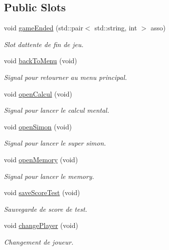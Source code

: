 \subsection*{Public Slots}
\begin{DoxyCompactItemize}
\item 
void \hyperlink{class_robin_main_window_a08e1d2b660c03aa711d552258a368ec0}{game\+Ended} (std\+::pair$<$ std\+::string, int $>$ asso)
\begin{DoxyCompactList}\small\item\em Slot d\textquotesingle{}attente de fin de jeu. \end{DoxyCompactList}\item 
void \hyperlink{class_robin_main_window_a0850e17ae24394b14eb2dcfc4f15eeca}{back\+To\+Menu} (void)
\begin{DoxyCompactList}\small\item\em Signal pour retourner au menu principal. \end{DoxyCompactList}\item 
void \hyperlink{class_robin_main_window_a55e49d0a4d727066b553fc2277dd8a78}{open\+Calcul} (void)
\begin{DoxyCompactList}\small\item\em Signal pour lancer le calcul mental. \end{DoxyCompactList}\item 
void \hyperlink{class_robin_main_window_ab00b403de3169493a08c53f5d623ce6b}{open\+Simon} (void)
\begin{DoxyCompactList}\small\item\em Signal pour lancer le super simon. \end{DoxyCompactList}\item 
void \hyperlink{class_robin_main_window_aaf62641d678eb0f8829a2fb9c513ae68}{open\+Memory} (void)
\begin{DoxyCompactList}\small\item\em Signal pour lancer le memory. \end{DoxyCompactList}\item 
\mbox{\label{class_robin_main_window_a3fb974c65b231fe737c9574acf989c36}} 
void \hyperlink{class_robin_main_window_a3fb974c65b231fe737c9574acf989c36}{save\+Score\+Test} (void)
\begin{DoxyCompactList}\small\item\em Sauvegarde de score de test. \end{DoxyCompactList}\item 
\mbox{\label{class_robin_main_window_a8bd52ec1bdbcbeaee45005ce4f0196f3}} 
void \hyperlink{class_robin_main_window_a8bd52ec1bdbcbeaee45005ce4f0196f3}{change\+Player} (void)
\begin{DoxyCompactList}\small\item\em Changement de joueur. \end{DoxyCompactList}\end{DoxyCompactItemize}
